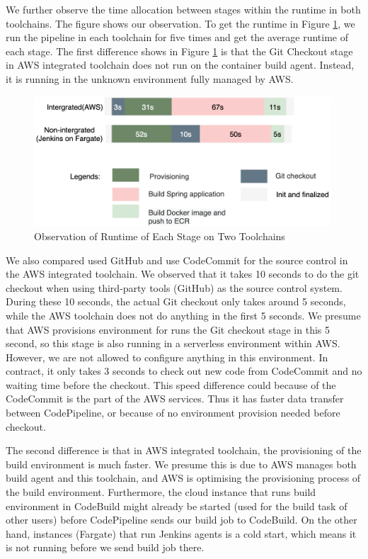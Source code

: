 \par
We further observe the time allocation between stages within the runtime in both toolchains. The figure shows our observation. To get the runtime in Figure \ref{fig:stage_runtime}, we run the pipeline in each toolchain for five times and get the average runtime of each stage. The first difference shows in Figure \ref{fig:stage_runtime} is that the Git Checkout stage in AWS integrated toolchain does not run on the container build agent. Instead, it is running in the unknown environment fully managed by AWS.
\begin{figure}[!h]
  \centering
  \includegraphics[width=0.99\textwidth]{pics/stages.png}
  \caption{Observation of Runtime of Each Stage on Two Toolchains}
  \label{fig:stage_runtime}
  \end{figure}
\par
We also compared used GitHub and use CodeCommit for the source control in the AWS integrated toolchain. 
We observed that it takes 10 seconds to do the git checkout when using third-party tools (GitHub) as the source control system. During these 10 seconds, the actual Git checkout only takes around 5 seconds, while the AWS toolchain does not do anything in the first 5 seconds. We presume that AWS provisions environment for runs the Git checkout stage in this 5 second, so this stage is also running in a serverless environment within AWS. However, we are not allowed to configure anything in this environment. In contract, it only takes 3 seconds to check out new code from CodeCommit and no waiting time before the checkout. This speed difference could because of the CodeCommit is the part of the AWS services. Thus it has faster data transfer between CodePipeline, or because of no environment provision needed before checkout.
\par
 The second difference is that in AWS integrated toolchain, the provisioning of the build environment is much faster. We presume this is due to AWS manages both build agent and this toolchain, and AWS is optimising the provisioning process of the build environment. Furthermore, the cloud instance that runs build environment in CodeBuild might already be started (used for the build task of other users) before CodePipeline sends our build job to CodeBuild. On the other hand, instances (Fargate) that run Jenkins agents is a cold start, which means it is not running before we send build job there.
